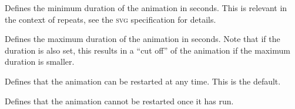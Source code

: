 \begin{command}{\pgfsys@animation@min{}}
  Defines the minimum duration of the animation in seconds. This is
  relevant in the context of repeats, see the \textsc{svg}
  specification for details.
\begin{codeexample}[width=3.5cm]
\end{codeexample}
\end{command}

\begin{command}{\pgfsys@animation@max{}}
  Defines the maximum duration of the animation in seconds. Note that
  if the duration is also set, this results in a ``cut off'' of the
  animation if the maximum duration is smaller.
\begin{codeexample}[width=3.5cm]
\end{codeexample}
\end{command}




\begin{command}{\pgfsys@animation@restart@always}
  Defines that the animation can be restarted at any time. This is the
  default.
\end{command}

\begin{command}{\pgfsys@animation@restart@never}
  Defines that the animation cannot be restarted once it has run.
\begin{codeexample}[width=3.5cm]
\end{codeexample}
\end{command}


